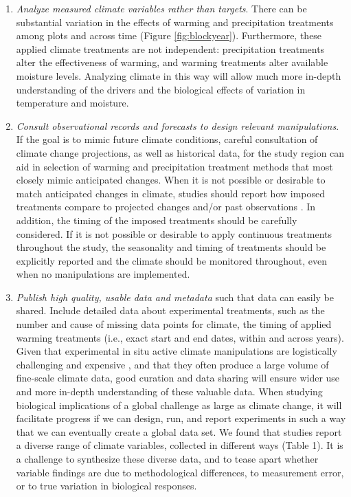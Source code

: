 \documentclass{article}
\begin{document}
\begin{enumerate}
\item\textit{Analyze measured climate variables rather than targets}. There can be substantial variation in the effects of warming and precipitation treatments among plots and across time (Figure \ref{fig:blockyear}). Furthermore, these applied climate treatments are not independent: precipitation treatments alter the effectiveness of warming, and warming treatments alter available moisture levels. Analyzing climate in this way will allow much more in-depth understanding of the drivers and the biological effects of variation in temperature and moisture.

\item\textit{Consult observational records and forecasts to design relevant manipulations}. If the goal is to mimic future climate conditions, careful consultation of climate change projections, as well as historical data, for the study region can aid in selection of warming and precipitation treatment methods that most closely mimic anticipated changes. When it is not possible or desirable to match anticipated changes in climate, studies should report how imposed treatments compare to projected changes and/or past observations \citep[see, e.g.,][]{hoover2014}. In addition, the timing of the imposed treatments should be carefully considered. If it is not possible or desirable to apply continuous treatments throughout the study, the seasonality and timing of treatments should be explicitly reported and the climate should be monitored throughout, even when no manipulations are implemented.

\item\textit{Publish high quality, usable data and metadata} such that data can easily be shared. Include detailed data about experimental treatments, such as the number and cause of missing data points for climate, the timing of applied warming treatments (i.e., exact start and end dates, within and across years). Given that experimental in situ active climate manipulations are logistically challenging and expensive \citep{aronson2009}, and that they often produce a large volume of fine-scale climate data, good curation and data sharing will ensure wider use and more in-depth understanding of these valuable data. When studying biological implications of a global challenge as large as climate change, it will facilitate progress if we can design, run, and report experiments in such a way that we can eventually create a global data set. We found that studies report a diverse range of climate variables, collected in different ways (Table 1). It is a challenge to synthesize these diverse data, and to tease apart whether variable findings are due to methodological differences, to measurement error, or to true variation in biological responses. 
\end{enumerate}

\clearpage
\end{document}
